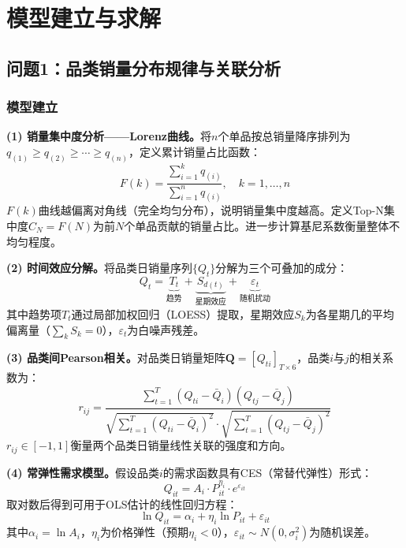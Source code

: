 \documentclass[12pt,a4paper]{ctexart}
\begin{document}
\section{模型建立与求解}

\subsection{问题1：品类销量分布规律与关联分析}

\subsubsection{模型建立}

\textbf{(1) 销量集中度分析——Lorenz曲线。}将$n$个单品按总销量降序排列为$q_{(1)} \ge q_{(2)} \ge \cdots \ge q_{(n)}$，定义累计销量占比函数：
\begin{equation}
    F(k) = \frac{\sum_{i=1}^{k} q_{(i)}}{\sum_{i=1}^{n} q_{(i)}},\quad k=1,\ldots,n
    \label{eq:lorenz}
\end{equation}
$F(k)$曲线越偏离对角线（完全均匀分布），说明销量集中度越高。定义Top-N集中度$C_N = F(N)$为前$N$个单品贡献的销量占比。进一步计算基尼系数衡量整体不均匀程度。

\textbf{(2) 时间效应分解。}将品类日销量序列$\{Q_t\}$分解为三个可叠加的成分：
\begin{equation}
    Q_t = \underbrace{T_t}_{\text{趋势}} + \underbrace{S_{d(t)}}_{\text{星期效应}} + \underbrace{\varepsilon_t}_{\text{随机扰动}}
    \label{eq:decomp}
\end{equation}
其中趋势项$T_t$通过局部加权回归（LOESS）提取，星期效应$S_k$为各星期几的平均偏离量（$\sum_k S_k = 0$），$\varepsilon_t$为白噪声残差。

\textbf{(3) 品类间Pearson相关。}对品类日销量矩阵$\mathbf{Q} = [Q_{ti}]_{T\times 6}$，品类$i$与$j$的相关系数为：
\begin{equation}
    r_{ij} = \frac{\sum_{t=1}^{T} (Q_{ti} - \bar{Q}_i)(Q_{tj} - \bar{Q}_j)}
    {\sqrt{\sum_{t=1}^{T} (Q_{ti} - \bar{Q}_i)^2} \cdot \sqrt{\sum_{t=1}^{T} (Q_{tj} - \bar{Q}_j)^2}}
    \label{eq:pearson}
\end{equation}
$r_{ij} \in [-1,1]$衡量两个品类日销量线性关联的强度和方向。

\textbf{(4) 常弹性需求模型。}假设品类$i$的需求函数具有CES（常替代弹性）形式：
\begin{equation}
    Q_{it} = A_i \cdot P_{it}^{\eta_i} \cdot e^{\varepsilon_{it}}
    \label{eq:demand}
\end{equation}
取对数后得到可用于OLS估计的线性回归方程：
\begin{equation}
    \ln Q_{it} = \alpha_i + \eta_i \ln P_{it} + \varepsilon_{it}
    \label{eq:logdemand}
\end{equation}
其中$\alpha_i = \ln A_i$，$\eta_i$为价格弹性（预期$\eta_i < 0$），$\varepsilon_{it} \sim N(0, \sigma_i^2)$为随机误差。
\end{document}

